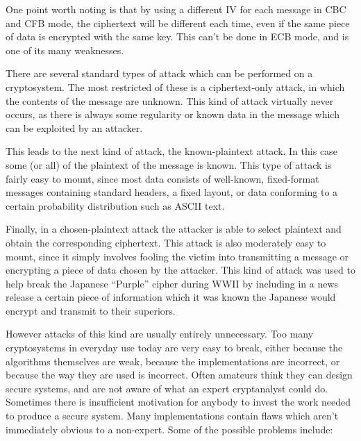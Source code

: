 One point worth noting is that by using a different IV for each message in CBC
and CFB mode, the ciphertext will be different each time, even if the same
piece of data is encrypted with the same key.  This can't be done in ECB mode,
and is one of its many weaknesses.

There are several standard types of attack which can be performed on a
cryptosystem.  The most restricted of these is a ciphertext-only attack, in
which the contents of the message are unknown.  This kind of attack virtually
never occurs, as there is always some regularity or known data in the message
which can be exploited by an attacker.

This leads to the next kind of attack, the known-plaintext attack.  In this
case some (or all) of the plaintext of the message is known.  This type of
attack is fairly easy to mount, since most data consists of well-known,
fixed-format messages containing standard headers, a fixed layout, or data
conforming to a certain probability distribution such as ASCII text.

Finally, in a chosen-plaintext attack the attacker is able to select plaintext
and obtain the corresponding ciphertext.  This attack is also moderately easy
to mount, since it simply involves fooling the victim into transmitting a
message or encrypting a piece of data chosen by the attacker.  This kind of
attack was used to help break the Japanese ``Purple'' cipher during WWII by
including in a news release a certain piece of information which it was known
the Japanese would encrypt and transmit to their superiors.

However attacks of this kind are usually entirely unnecessary.  Too many
cryptosystems in everyday use today are very easy to break, either because the
algorithms themselves are weak, because the implementations are incorrect, or
because the way they are used is incorrect.  Often amateurs think they can
design secure systems, and are not aware of what an expert cryptanalyst could
do.  Sometimes there is insufficient motivation for anybody to invest the work
needed to produce a secure system.  Many implementations contain flaws which
aren't immediately obvious to a non-expert.  Some of the possible problems
include:


